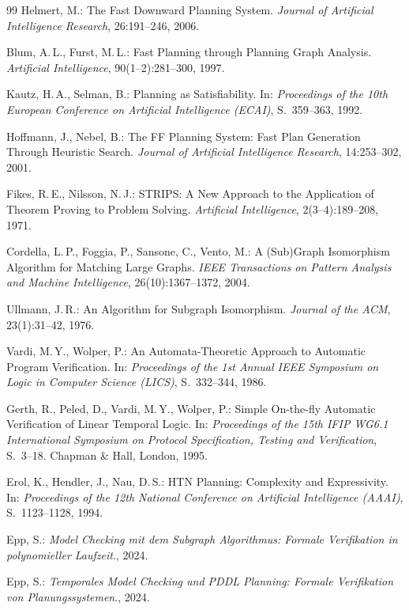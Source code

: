 ﻿\documentclass[a4paper,12pt]{article}
\theoremstyle{definition}
\begin{document}
\begin{thebibliography}{99}
Helmert, M.:
The Fast Downward Planning System.
\textit{Journal of Artificial Intelligence Research}, 26:191--246, 2006.

Blum, A.\,L., Furst, M.\,L.:
Fast Planning through Planning Graph Analysis.
\textit{Artificial Intelligence}, 90(1--2):281--300, 1997.

Kautz, H.\,A., Selman, B.:
Planning as Satisfiability.
In: \textit{Proceedings of the 10th European Conference on Artificial Intelligence (ECAI)}, S.~359--363, 1992.

Hoffmann, J., Nebel, B.:
The FF Planning System: Fast Plan Generation Through Heuristic Search.
\textit{Journal of Artificial Intelligence Research}, 14:253--302, 2001.

Fikes, R.\,E., Nilsson, N.\,J.:
STRIPS: A New Approach to the Application of Theorem Proving to Problem Solving.
\textit{Artificial Intelligence}, 2(3--4):189--208, 1971.

Cordella, L.\,P., Foggia, P., Sansone, C., Vento, M.:
A (Sub)Graph Isomorphism Algorithm for Matching Large Graphs.
\textit{IEEE Transactions on Pattern Analysis and Machine Intelligence}, 26(10):1367--1372, 2004.

Ullmann, J.\,R.:
An Algorithm for Subgraph Isomorphism.
\textit{Journal of the ACM}, 23(1):31--42, 1976.

Vardi, M.\,Y., Wolper, P.:
An Automata-Theoretic Approach to Automatic Program Verification.
In: \textit{Proceedings of the 1st Annual IEEE Symposium on Logic in Computer Science (LICS)}, S.~332--344, 1986.

Gerth, R., Peled, D., Vardi, M.\,Y., Wolper, P.:
Simple On-the-fly Automatic Verification of Linear Temporal Logic.
In: \textit{Proceedings of the 15th IFIP WG6.1 International Symposium on Protocol Specification, Testing and Verification}, S.~3--18. Chapman \& Hall, London, 1995.

Erol, K., Hendler, J., Nau, D.\,S.:
HTN Planning: Complexity and Expressivity.
In: \textit{Proceedings of the 12th National Conference on Artificial Intelligence (AAAI)}, S.~1123--1128, 1994.


Epp, S.:
\textit{Model Checking mit dem Subgraph Algorithmus: Formale Verifikation in polynomieller Laufzeit}., 2024.

Epp, S.:
\textit{Temporales Model Checking und PDDL Planning: Formale Verifikation von Planungssystemen}., 2024.



\end{thebibliography}
\end{document}
